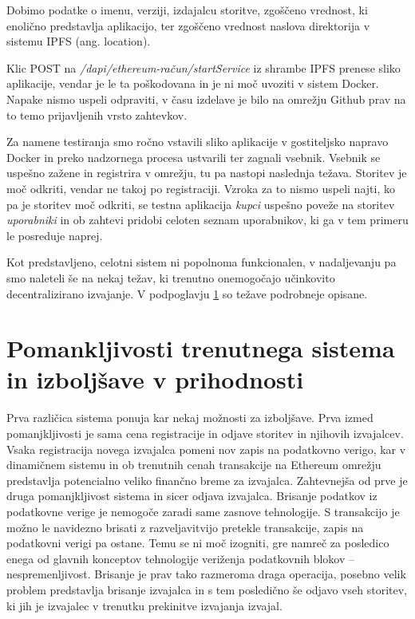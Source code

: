 \documentclass[a4paper, 12pt]{book}
\begin{document}
Dobimo podatke o imenu, verziji, izdajalcu storitve, zgoščeno vrednost, ki enolično predstavlja aplikacijo, ter zgoščeno vrednost naslova direktorija v sistemu IPFS (ang. location).

Klic POST na \textit{/dapi/{ethereum-račun}/startService} iz shrambe IPFS prenese sliko aplikacije, vendar je le ta poškodovana in je ni moč uvoziti v sistem Docker.
Napake nismo uspeli odpraviti, v času izdelave je bilo na omrežju Github prav na to temo prijavljenih vrsto zahtevkov.

Za namene testiranja smo ročno vstavili sliko aplikacije v gostiteljsko napravo Docker in preko nadzornega procesa ustvarili ter zagnali vsebnik.
Vsebnik se uspešno zažene in registrira v omrežju, tu pa nastopi naslednja težava.
Storitev je moč odkriti, vendar ne takoj po registraciji.
Vzroka za to nismo uspeli najti, ko pa je storitev moč odkriti, se testna aplikacija \textit{kupci} uspešno poveže na storitev \textit{uporabniki} in ob zahtevi pridobi celoten seznam uporabnikov, ki ga v tem primeru le posreduje naprej.

Kot predstavljeno, celotni sistem ni popolnoma funkcionalen, v nadaljevanju pa smo naleteli še na nekaj težav, ki trenutno onemogočajo učinkovito decentralizirano izvajanje.
V podpoglavju \ref{improvments} so težave podrobneje opisane.


\section{Pomankljivosti trenutnega sistema in izboljšave v prihodnosti}
\label{improvments}

Prva različica sistema ponuja kar nekaj možnosti za izboljšave.
Prva izmed pomanjkljivosti je sama cena registracije in odjave storitev in njihovih izvajalcev.
Vsaka registracija novega izvajalca pomeni nov zapis na podatkovno verigo, kar v dinamičnem sistemu in ob trenutnih cenah transakcije na Ethereum omrežju predstavlja potencialno veliko finančno breme za izvajalca.
Zahtevnejša od prve je druga pomanjkljivost sistema in sicer odjava izvajalca.
Brisanje podatkov iz podatkovne verige je nemogoče zaradi same zasnove tehnologije.
S transakcijo je možno le navidezno brisati z razveljavitvijo pretekle transakcije, zapis na podatkovni verigi pa ostane.
Temu se ni moč izogniti, gre namreč za posledico enega od glavnih konceptov tehnologije veriženja podatkovnih blokov -- nespremenljivost.
Brisanje je prav tako razmeroma draga operacija, posebno velik problem predstavlja brisanje izvajalca in s tem posledično še odjavo vseh storitev, ki jih je izvajalec v trenutku prekinitve izvajanja izvajal.
\end{document}
